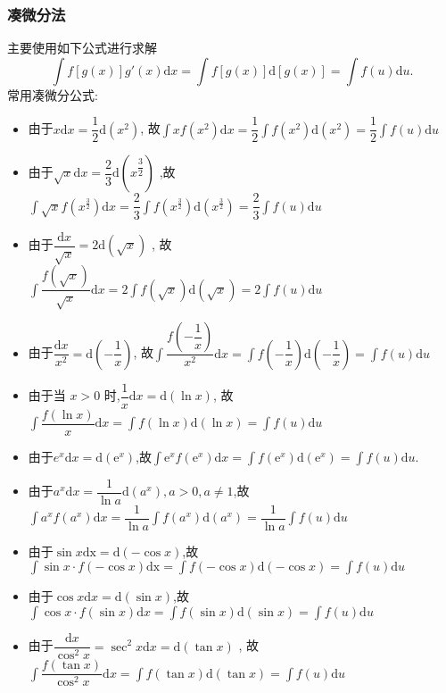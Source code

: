 \documentclass[8pt a4paper, oneside, UTF8]{ctexbook}
\begin{document}
\begin{sloppypar}
    \subsubsection{凑微分法}
    主要使用如下公式进行求解
    $$
        \int f[g(x)]g'(x)\mathrm{d}x=\int f[g(x)]\mathrm{d}[g(x)]=\int f(u)\mathrm{d}u.
    $$
    常用凑微分公式:
    \begin{itemize}
        \item 由于$x \mathrm{d}x={\dfrac{1}{2}} \mathrm{d}(x^{2})$, 故$\int xf(x^{2})\mathrm{d}x={\dfrac{1}{2}}\int f(x^{2})\mathrm{d}(x^{2})={\dfrac{1}{2}}\int f(u)\mathrm{d}u$
        \item 由于$\sqrt{x} \mathrm{d}x=\dfrac{2}{3}\mathrm{d}(x^{\dfrac{3}{2}})$ ,故$\int\sqrt{x}f(x^{\frac{3}{2}})\mathrm{d}x=\dfrac{2}{3}\int f(x^{\frac{3}{2}})\mathrm{d}(x^{\frac{3}{2}})=\dfrac{2}{3}\int f(u)\mathrm{d}u$
        \item 由于$\dfrac{\mathrm{d}x}{\sqrt{x}}=2 \mathrm{d}(\sqrt{x})$ , 故$\int\dfrac{f(\sqrt{x})}{\sqrt{x}}\mathrm{d}x=2\int f(\sqrt{x})\mathrm{d}(\sqrt{x})=2\int f(u)\mathrm{d}u$
        \item 由于$\dfrac{\mathrm{d}x}{x^{2}}=\mathrm{d}\left(-\dfrac{1}{x}\right)$, 故$\int\dfrac{f\left(-\dfrac{1}{x}\right)}{x^{2}}\mathrm{d}x=\int f\left(-\dfrac{1}{x}\right)\mathrm{d}\left(-\dfrac{1}{x}\right)=\int f(u)\mathrm{d}u$
        \item 由于当 $x>0$ 时,$\dfrac{1}{x}\mathrm{d}x=\mathrm{d}(\ln x)$, 故$\int\dfrac{f(\ln x)}{x}\mathrm{d}x=\int f(\ln x)\mathrm{d}(\ln x)=\int f(u)\mathrm{d}u $
        \item 由于$e^{x} \mathrm{d}x=\mathrm{d}(\mathrm{e}^{x})$,故$\int\mathrm{e}^{x}f(\mathrm{e}^{x})\mathrm{d}x=\int f(\mathrm{e}^{x})\mathrm{d}(\mathrm{e}^{x})=\int f(u)\mathrm{d}u$.
        \item 由于$a^{x} \mathrm{d}x=\dfrac{1}{\ln a}\mathrm{d}(a^{x}),a>0,a\neq1$,故$\int a^{x}f(a^{x})\mathrm{d}x=\dfrac{1}{\ln a}\int f(a^{x})\mathrm{d}(a^{x})=\dfrac{1}{\ln a}\int f(u)\mathrm{d}u$
        \item 由于$\sin x \mathrm{dx}=\mathrm{d}(-\cos x)$,故$\int\sin x \cdot f(-\cos x)\mathrm{dx}=\int f(-\cos x)\mathrm{d}(-\cos x)=\int f(u)\mathrm{d}u$
        \item 由于$\cos x \mathrm{d}x=\mathrm{d}(\sin x)$,故$\int\cos x \cdot f(\sin x)\mathrm{d}x=\int f(\sin x)\mathrm{d}(\sin x)=\int f(u)\mathrm{d}u$
        \item 由于$\dfrac{\mathrm{d}x}{\cos^{2}x}=\sec^{2}x \mathrm{d}x=\mathrm{d}(\tan x)$ , 故$\int\dfrac{f(\tan x)}{\cos^{2}x}\mathrm{d}x=\int f(\tan x)\mathrm{d}(\tan x)=\int f(u)\mathrm{d}u$

\end{itemize}
\end{sloppypar}
\end{document}
